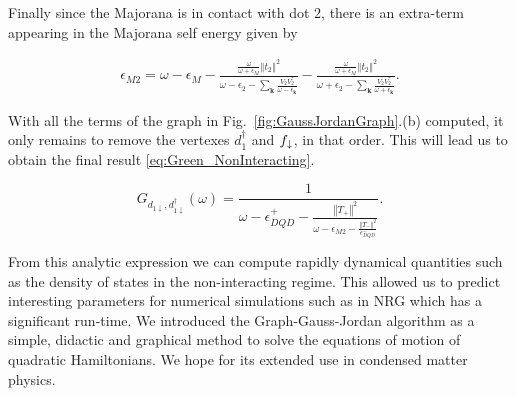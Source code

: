 \documentclass[showpacs,aps,prb,reprint,superscriptaddress]{revtex4-1}
\begin{document}
Finally since the Majorana is in contact with dot $2$, there is an extra-term appearing in the  Majorana self energy given by 

    
%     
    

\begin{equation}
    \begin{aligned}
        \epsilon_{M2}=  \omega-\epsilon_{M}  -\frac{\frac{\omega}{\omega+\epsilon_{M}}\left\Vert t_{2}\right\Vert ^{2} } {\omega-\epsilon_{2}-\sum_{\mathbf{k}}\frac{V_{2}V_{2}^{*}}{\omega-\epsilon_{\mathbf{k}}}} 
         - \frac{\frac{\omega}{\omega+\epsilon_{M}}\left\Vert t_{2}\right\Vert ^{2}}{\omega+\epsilon_{2}-\sum_{\mathbf{k}}\frac{V_{2}V_{2}^{*}}{\omega+\epsilon_{\mathbf{k}}}}. 
    \end{aligned}
    \label{eq:M2_append}
\end{equation}

With all the terms of the graph in Fig.\ \ref{fig:GaussJordanGraph}.(b) computed, it only remains to remove the vertexes $d^\dagger_1$ and $f_\downarrow$, in that order. This will lead us  to obtain the final result \eqref{eq:Green_NonInteracting}. 


\begin{equation}
    G_{{d_{1\downarrow},d_{1\downarrow}^{\dagger}}}\left(\omega\right)=\frac{1}{\omega-\epsilon_{DQD}^{+}-\frac{\left\Vert T_{+}\right\Vert ^{2}}{\omega-\epsilon_{M2}-\frac{\left\Vert T_{-}\right\Vert ^{2}}{\epsilon_{DQD}^{-}}}}.
     \label{eq:2Green_NonInteracting}
\end{equation}

\noindent From this analytic expression we can compute rapidly dynamical quantities such as the density of states in the non-interacting regime. This allowed us to predict interesting parameters for numerical simulations such as in NRG which has a significant run-time. We introduced the Graph-Gauss-Jordan algorithm as a simple, didactic and graphical method to solve the equations of motion of quadratic Hamiltonians. We hope for its extended use in condensed matter physics.


\end{document}
